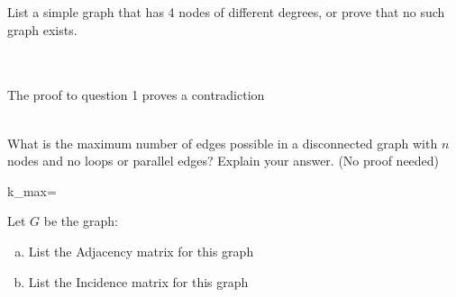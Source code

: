 \documentclass[10pt,letterpaper, cm]{hmcpset}
\begin{document}
\begin{problem}[3]
  List a simple graph that has 4 nodes of different degrees, or prove that no such graph exists.
\end{problem}\\
\\The proof to question 1 proves a contradiction\\\\
\begin{problem}[4]
What is the maximum number of edges possible in a disconnected graph with $n$ nodes and no loops or parallel edges?  Explain your answer. (No proof needed)
\end{problem}
k_{max}=\\

\begin{problem}[5]
Let $G$ be the graph:


\begin{center}

\end{center}

\begin{enumerate}[(a)]
    \item List the Adjacency matrix for this graph
    \item List the Incidence matrix for this graph
\end{enumerate}
\end{problem}
\end{document}
